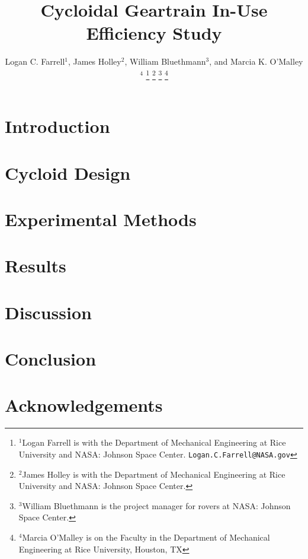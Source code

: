 \documentclass[letterpaper, 10 pt, conference]{ieeeconf}  %
\title{\LARGE \bf
Cycloidal Geartrain In-Use Efficiency Study
}
\author{Logan C. Farrell$^{1}$, James Holley$^{2}$, William Bluethmann$^{3}$, and Marcia K. O'Malley$^{4}$%
\thanks{$^{1}$Logan Farrell is with the Department of Mechanical Engineering at Rice University and NASA: Johnson Space Center.
		{\tt\small Logan.C.Farrell@NASA.gov}}%
\thanks{$^{2}$James Holley is with the Department of Mechanical Engineering at Rice University and NASA: Johnson Space Center.}%
\thanks{$^{3}$William Bluethmann is the project manager for rovers at NASA: Johnson Space Center.}%
\thanks{$^{4}$Marcia O'Malley is on the Faculty in the Department of Mechanical Engineering at Rice University, Houston, TX}%
}
\begin{document}
\maketitle
\thispagestyle{empty}
\pagestyle{empty}

\begin{abstract}

\end{abstract}

\section{Introduction}
\label{intro}


\section{Cycloid Design}
\label{design}


\section{Experimental Methods}
\label{methods}


\section{Results}
\label{results}


\section{Discussion}
\label{discussion}


\section{Conclusion}
\label{conclusion}


\section{Acknowledgements}
\label{acknowledgements}




\end{document}
